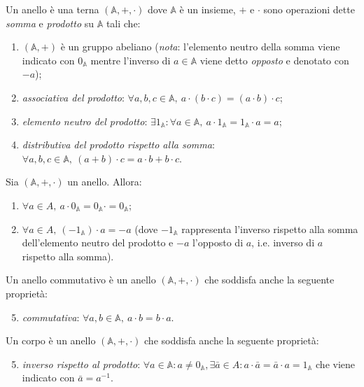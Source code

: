 \begin{definition}[anello]
	Un anello è una terna $ (\mathbb{A}, +, \cdot) $ dove $ \mathbb{A} $ è un insieme, $ + $ e $ \cdot $ sono operazioni dette \emph{somma} e \emph{prodotto} su $ \mathbb{A} $ tali che:
	\begin{enumerate}[label = (\roman*)]
		\item $ (\mathbb{A}, +) $ è un gruppo abeliano (\emph{nota}: l'elemento neutro della somma viene indicato con $ 0_{\mathbb{A}} $ mentre l'inverso di $ a \in \mathbb{A} $ viene detto \emph{opposto} e denotato con $ - a $);
		\item \emph{associativa del prodotto}: $ \forall a, b, c \in \mathbb{A}, \ a \cdot (b \cdot c) = (a \cdot b) \cdot c $;
		\item \emph{elemento neutro del prodotto}: $ \exists 1_{\mathbb{A}} : \forall a \in \mathbb{A}, \ a \cdot 1_{\mathbb{A}} = 1_{\mathbb{A}} \cdot a = a $;
		\item \emph{distributiva del prodotto rispetto alla somma}: $ \forall a, b, c \in \mathbb{A}, \ (a + b) \cdot c = a \cdot b + b \cdot c $. 
	\end{enumerate}
\end{definition}

\begin{thm}
	Sia $ (\mathbb{A}, +, \cdot) $ un anello. Allora:
	\begin{enumerate}
		\item $ \forall a \in A, \ a \cdot 0_{\mathbb{A}} = 0_{\mathbb{A}} \cdot = 0_{\mathbb{A}} $;
		\item $ \forall a \in A, \ (- 1_{\mathbb{A}}) \cdot a = - a $ (dove $ - 1_{\mathbb{A}} $ rappresenta l'inverso rispetto alla somma dell'elemento neutro del prodotto e $ - a $ l'opposto di $ a $, i.e. inverso di $ a $ rispetto alla somma).
	\end{enumerate}
\end{thm}

\begin{definition}
	Un anello commutativo è un anello $ (\mathbb{A}, +, \cdot) $ che soddisfa anche la seguente proprietà:
	\begin{enumerate}[label = (\roman*)]
		\setcounter{enumi}{4}
		\item \emph{commutativa}: $ \forall a, b \in \mathbb{A}, \ a \cdot b = b \cdot a $.
	\end{enumerate}
\end{definition}

\begin{definition}[corpo]
	Un corpo è un anello $ 
	(\mathbb{A}, +, \cdot) $ che soddisfa anche la seguente proprietà:
	\begin{enumerate}[label = (\roman*)]
		\setcounter{enumi}{4}
		\item \emph{inverso rispetto al prodotto}: $ \forall a \in \mathbb{A}: a \neq 0_{\mathbb{A}}, \exists \bar{a} \in A : a \cdot \bar{a} = \bar{a} \cdot a = 1_{\mathbb{A}} $ che viene indicato con $ \bar{a} = a^{-1} $.
	\end{enumerate}
\end{definition}

